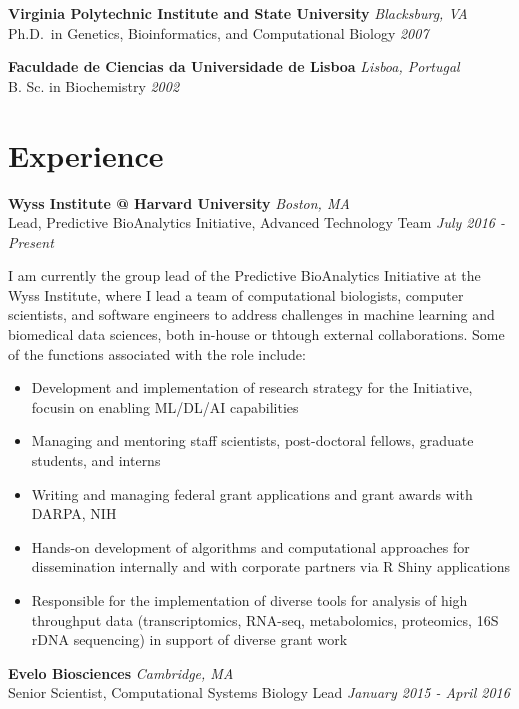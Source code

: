 \documentclass[11pt,a4paper,]{awesome-cv}
\providecommand{\tightlist}{%
	\setlength{\itemsep}{0pt}\setlength{\parskip}{0pt}}
\begin{document}
\textbf{{Virginia Polytechnic Institute and State University}}
\hfill \emph{Blacksburg, VA}\\
Ph.D.~in Genetics, Bioinformatics, and Computational Biology
\hfill \emph{2007}

\textbf{{Faculdade de Ciencias da Universidade de Lisboa}}
\hfill \emph{Lisboa, Portugal}\\
B. Sc. in Biochemistry \hfill \emph{2002}

\hypertarget{experience}{%
\section{Experience}\label{experience}}

\textbf{{Wyss Institute @ Harvard University}} \hfill \emph{Boston,
MA}\\
Lead, Predictive BioAnalytics Initiative, Advanced Technology Team
\hfill \emph{July 2016 - Present}

I am currently the group lead of the Predictive BioAnalytics Initiative
at the Wyss Institute, where I lead a team of computational biologists,
computer scientists, and software engineers to address challenges in
machine learning and biomedical data sciences, both in-house or thtough
external collaborations. Some of the functions associated with the role
include:

\begin{itemize}
\tightlist
\item
  Development and implementation of research strategy for the
  Initiative, focusin on enabling ML/DL/AI capabilities
\item
  Managing and mentoring staff scientists, post-doctoral fellows,
  graduate students, and interns
\item
  Writing and managing federal grant applications and grant awards with
  DARPA, NIH
\item
  Hands-on development of algorithms and computational approaches for
  dissemination internally and with corporate partners via R Shiny
  applications
\item
  Responsible for the implementation of diverse tools for analysis of
  high throughput data (transcriptomics, RNA-seq, metabolomics,
  proteomics, 16S rDNA sequencing) in support of diverse grant work
\end{itemize}

\textbf{{Evelo Biosciences}} \hfill \emph{Cambridge, MA}\\
Senior Scientist, Computational Systems Biology Lead
\hfill \emph{January 2015 - April 2016}
\end{document}
